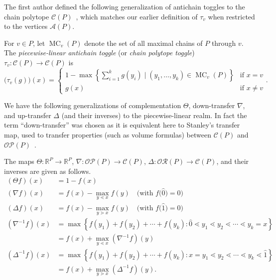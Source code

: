 \documentclass[ALCO,ThmDefs,Unicode,epreuves]{cedram}
\newcommand{\defn}[1]{\emph{#1}}
\newcommand{\rr}{\mathbb{R}}
\newcommand{\ra}{\rightarrow}
\newcommand{\down}{\nabla}
\newcommand{\up}{\Delta}
\DeclareMathOperator{\mc}{MC}
\newcommand{\cala}{\mathcal{A}}
\newcommand{\calc}{\mathcal{C}}
\newcommand{\calo}{\mathcal{O}}
\newcommand{\calp}{\mathcal{P}}
\newcommand{\calr}{\mathcal{R}}
\begin{document}
The first author defined the following generalization of antichain toggles to the chain
polytope $\calc(P)$~\cite[\S~3]{antichain-toggling}, which matches our earlier definition
of $\tau_v$ when restricted to the vertices $\cala(P)$. 

\begin{defi}\label{def:PL-ant-tog}
For $v\in P$, let $\mc_v(P)$ denote the set of all maximal chains of $P$ through $v$.
The \defn{piecewise-linear antichain toggle}
(or \defn{chain polytope toggle}) $\tau_v:\calc(P)\ra \calc(P)$ is
\[
\big(\tau_v(g)\big)(x) =
\begin{cases}
1-\max\left\{ %
\sum\limits_{i=1}^k g(y_i) %
\mid (y_1,\dots,y_k)\in \mc_v(P) \right\}
&\text{if }x=v\\
g(x) &\text{if }x\not=v
\end{cases}.
\]
\end{defi}

We have the following generalizations of complementation $\Theta$,
down-transfer $\down$, and up-transfer $\up$ (and their inverses)
to the piecewise-linear realm.
In fact the term ``down-transfer'' was chosen as it is equivalent here to
Stanley's transfer map, used to transfer properties (such as volume formulas) between $\calc(P)$
and $\calo\calp(P)$~\cite{Sta86}.

\begin{defi}
The maps $\Theta: \rr^P \ra \rr^P$, $\down: \calo\calp(P) \ra \calc(P)$,
$\up: \calo\calr(P) \ra \calc(P)$, and their inverses are given as follows.
\begin{align*}
 (\Theta f)(x) &= 1-f(x)\\
 (\down f)(x) &= f(x)-{\max\limits_{y\lessdot x} f(y)} \quad \big(\text{with } f\big(\widehat{0}\big)=0\big)\\
 (\up f)(x) &= 
 f(x) - {\max\limits_{y\gtrdot x} f(y)} \quad \big(\text{with } f\big(\widehat{1}\big)=0\big)\\
 \left(\down^{-1}f\right)(x) &=
 \max\left\{ f(y_1)+f(y_2)+\cdots +f(y_k):
 \widehat{0}\lessdot y_1\lessdot y_2 \lessdot \cdots \lessdot y_k=x \right\}\\
 &=f(x)+ \max\limits_{y\lessdot x}\left(\down^{-1}f\right)(y)\\
 \left(\up^{-1}f\right)(x) &=
 \max\left\{ f(y_1)+ f(y_2)+\cdots +f(y_k):x=y_1
\lessdot y_2\lessdot \cdots \lessdot y_k\lessdot \widehat{1}\right\}\\
 &=f(x)+ \max\limits_{y\gtrdot x}\left(\up^{-1}f\right)(y).
\end{align*}
\end{defi}
\end{document}

